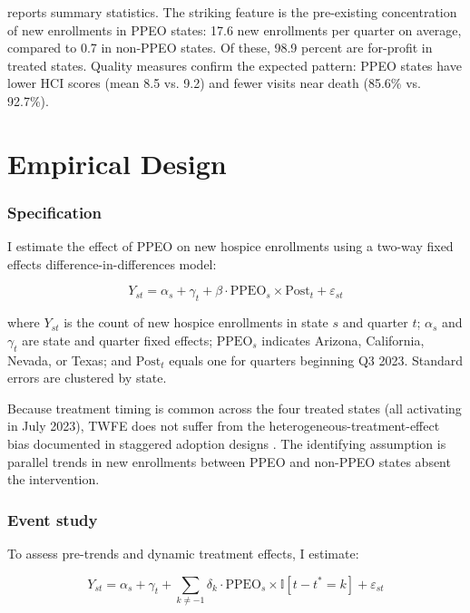 \documentclass[12pt]{article}
\newcommand{\ind}{\mathbb{I}}
\begin{document}
 reports summary statistics. The striking feature is the pre-existing concentration of new enrollments in PPEO states: 17.6 new enrollments per quarter on average, compared to 0.7 in non-PPEO states. Of these, 98.9 percent are for-profit in treated states. Quality measures confirm the expected pattern: PPEO states have lower HCI scores (mean 8.5 vs. 9.2) and fewer visits near death (85.6\% vs. 92.7\%).




\section{Empirical Design}
\label{sec:design}

\subsubsection*{Specification} I estimate the effect of PPEO on new hospice enrollments using a two-way fixed effects difference-in-differences model:

\begin{equation}
Y_{st} = \alpha_s + \gamma_t + \beta \cdot \text{PPEO}_s \times \text{Post}_t + \varepsilon_{st}
\label{eq:did}
\end{equation}

\noindent where $Y_{st}$ is the count of new hospice enrollments in state $s$ and quarter $t$; $\alpha_s$ and $\gamma_t$ are state and quarter fixed effects; $\text{PPEO}_s$ indicates Arizona, California, Nevada, or Texas; and $\text{Post}_t$ equals one for quarters beginning Q3 2023. Standard errors are clustered by state.

Because treatment timing is common across the four treated states (all activating in July 2023), TWFE does not suffer from the heterogeneous-treatment-effect bias documented in staggered adoption designs \citep{goodman2021difference, sun2021estimating}. The identifying assumption is parallel trends in new enrollments between PPEO and non-PPEO states absent the intervention.

\subsubsection*{Event study} To assess pre-trends and dynamic treatment effects, I estimate:

\begin{equation}
Y_{st} = \alpha_s + \gamma_t + \sum_{k \neq -1} \delta_k \cdot \text{PPEO}_s \times \ind[t - t^* = k] + \varepsilon_{st}
\label{eq:eventstudy}
\end{equation}
\end{document}
